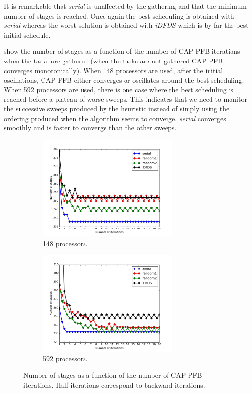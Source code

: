 \documentclass{mc2015}
\renewcommand{\(}{\left(}
\renewcommand{\)}{\right)}
\renewcommand{\[}{\left[}
\renewcommand{\]}{\right]}
\begin{document}
It is remarkable that \emph{serial} is unaffected by the gathering and that the
minimum number of stages is reached. Once again the best scheduling is obtained
with \emph{serial} whereas the worst solution is obtained with \emph{iDFDS}
which is by far the best initial schedule.

 show the number of stages
as a function of the number of CAP-PFB iterations when the tasks are gathered (when the
tasks are not gathered CAP-PFB converges monotonically). When 148 processors are
used, after the initial oscillations, CAP-PFB either converges or oscillates
around the best scheduling. When 592 processors are used, there is one case
where the best scheduling is reached before a plateau of worse sweeps. This
indicates that we need to monitor the successive sweeps produced by the
heuristic instead of simply using the ordering produced when the algorithm seems
to converge. \emph{serial} converges smoothly and is faster to converge than the
other sweeps.

\begin{figure}[H]
  \begin{subfigure}[b]{.5\textwidth}
    \centering
    \includegraphics[width=7cm]{convergence_central_148}
    \caption{148 processors.}
  \label{convergence_central_148}
  \end{subfigure}
  \begin{subfigure}[b]{.5\textwidth}
    \centering
    \includegraphics[width=7cm]{convergence_central_592}
    \caption{592 processors.}
  \label{convergence_central_592}
  \end{subfigure}
  \caption{Number of stages as a function of the number of CAP-PFB iterations.
  Half iterations correspond to backward iterations.}
\end{figure}
\end{document}
